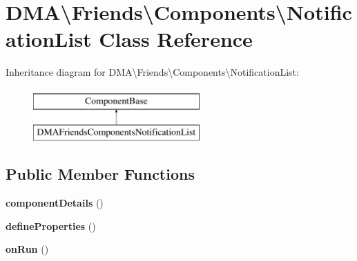 \hypertarget{classDMA_1_1Friends_1_1Components_1_1NotificationList}{\section{D\-M\-A\textbackslash{}Friends\textbackslash{}Components\textbackslash{}Notification\-List Class Reference}
\label{classDMA_1_1Friends_1_1Components_1_1NotificationList}
}
Inheritance diagram for D\-M\-A\textbackslash{}Friends\textbackslash{}Components\textbackslash{}Notification\-List\-:\begin{figure}[H]
\begin{center}
\leavevmode
\includegraphics[height=2.000000cm]{dc/d03/classDMA_1_1Friends_1_1Components_1_1NotificationList}
\end{center}
\end{figure}
\subsection*{Public Member Functions}
\begin{DoxyCompactItemize}
\item 
\hypertarget{classDMA_1_1Friends_1_1Components_1_1NotificationList_a5f6b1107482bf7d15e379cad1c58e537}{{\bfseries component\-Details} ()}\label{classDMA_1_1Friends_1_1Components_1_1NotificationList_a5f6b1107482bf7d15e379cad1c58e537}

\item 
\hypertarget{classDMA_1_1Friends_1_1Components_1_1NotificationList_a0e98d6eba8a7d10629c7a0e051937d98}{{\bfseries define\-Properties} ()}\label{classDMA_1_1Friends_1_1Components_1_1NotificationList_a0e98d6eba8a7d10629c7a0e051937d98}

\item 
\hypertarget{classDMA_1_1Friends_1_1Components_1_1NotificationList_a5756b2cf174bc7919896c256ad9f44aa}{{\bfseries on\-Run} ()}\label{classDMA_1_1Friends_1_1Components_1_1NotificationList_a5756b2cf174bc7919896c256ad9f44aa}

\end{DoxyCompactItemize}
